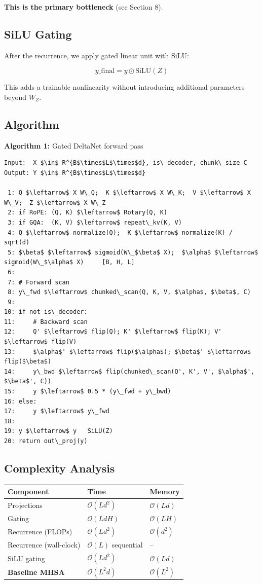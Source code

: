 \textbf{This is the primary bottleneck} (see Section 8).

\subsection{SiLU Gating}

After the recurrence, we apply gated linear unit with SiLU:

\[
y\_\text{final} = y \odot \text{SiLU}(Z)
\tag{4.9}
\]

This adds a trainable nonlinearity without introducing additional parameters 
beyond $W_Z$.

\subsection{Algorithm}

\textbf{Algorithm 1:} Gated DeltaNet forward pass
\begin{lstlisting}
Input:  X $\in$ R^{B$\times$L$\times$d}, is\_decoder, chunk\_size C
Output: Y $\in$ R^{B$\times$L$\times$d}

 1: Q $\leftarrow$ X W\_Q;  K $\leftarrow$ X W\_K;  V $\leftarrow$ X W\_V;  Z $\leftarrow$ X W\_Z
 2: if RoPE: (Q, K) $\leftarrow$ Rotary(Q, K)
 3: if GQA:  (K, V) $\leftarrow$ repeat\_kv(K, V)
 4: Q $\leftarrow$ normalize(Q);  K $\leftarrow$ normalize(K) / sqrt(d)
 5: $\beta$ $\leftarrow$ sigmoid(W\_$\beta$ X);  $\alpha$ $\leftarrow$ sigmoid(W\_$\alpha$ X)     [B, H, L]
 6:
 7: # Forward scan
 8: y\_fwd $\leftarrow$ chunked\_scan(Q, K, V, $\alpha$, $\beta$, C)
 9:
10: if not is\_decoder:
11:     # Backward scan
12:     Q' $\leftarrow$ flip(Q); K' $\leftarrow$ flip(K); V' $\leftarrow$ flip(V)
13:     $\alpha$' $\leftarrow$ flip($\alpha$); $\beta$' $\leftarrow$ flip($\beta$)
14:     y\_bwd $\leftarrow$ flip(chunked\_scan(Q', K', V', $\alpha$', $\beta$', C))
15:     y $\leftarrow$ 0.5 * (y\_fwd + y\_bwd)
16: else:
17:     y $\leftarrow$ y\_fwd
18:
19: y $\leftarrow$ y   SiLU(Z)
20: return out\_proj(y)
\end{lstlisting}

\subsection{Complexity Analysis}

\begin{table}[H]
\centering
\small
\begin{tabular}{lll}
\toprule
\textbf{Component} & \textbf{Time} & \textbf{Memory} \\
\midrule
Projections & $\mathcal{O}(Ld^2)$ & $\mathcal{O}(Ld)$ \\
Gating & $\mathcal{O}(LdH)$ & $\mathcal{O}(LH)$ \\
Recurrence (FLOPs) & $\mathcal{O}(Ld^2)$ & $\mathcal{O}(d^2)$ \\
Recurrence (wall-clock) & $\mathcal{O}(L)$ sequential & -- \\
SiLU gating & $\mathcal{O}(Ld^2)$ & $\mathcal{O}(Ld)$ \\
\textbf{Baseline MHSA} & $\mathcal{O}(L^2 d)$ & $\mathcal{O}(L^2)$ \\
\bottomrule
\end{tabular}
\end{table}

